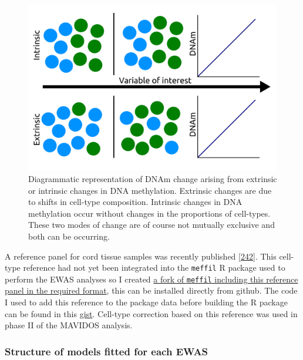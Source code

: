 \documentclass[
]{book}
\begin{document}
\begin{figure}

{\centering \includegraphics[width=0.8\linewidth]{figs/IntrinsicVsExtrinsicDNAmChangeGeneral} 

}

\caption{Diagrammatic representation of DNAm change arising from extrinsic or intrinsic changes in DNA methylation. Extrinsic changes are due to shifts in cell-type composition. Intrinsic changes in DNA methylation occur without changes in the proportions of cell-types. These two modes of change are of course not mutually exclusive and both can be occurring.}\label{fig:IntrinsicVsExtrinsicDNAmChangeGeneral}
\end{figure}



A reference panel for cord tissue samples was recently published {[}\protect\hyperlink{ref-Lin2018}{242}{]}.
This cell-type reference had not yet been integrated into the \texttt{meffil} R package used to perform the EWAS analyses so I created \href{https://github.com/RichardJActon/meffil/blob/LinAndKarnaniCordTissueRef/data-raw/lin-karnani-reference.r}{a fork of \texttt{meffil} including this reference panel in the required format}, this can be installed directly from github.
The code I used to add this reference to the package data before building the R package can be found in this \href{https://gist.github.com/RichardJActon/703ae70438e865a37998cd608bd12cd3}{gist}.
Cell-type correction based on this reference was used in phase II of the MAVIDOS analysis.

\hypertarget{structure-of-models-fitted-for-each-ewas}{%
\subsubsection{Structure of models fitted for each EWAS}\label{structure-of-models-fitted-for-each-ewas}}
\end{document}
